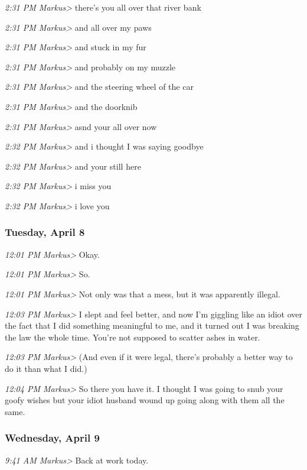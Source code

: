 {\emph{2:31 PM Markus\textgreater{}} there's you all over that river bank

\emph{2:31 PM Markus\textgreater{}} and all over my paws

\emph{2:31 PM Markus\textgreater{}} and stuck in my fur

\emph{2:31 PM Markus\textgreater{}} and probably on my muzzle

\emph{2:31 PM Markus\textgreater{}} and the steering wheel of the car

\emph{2:31 PM Markus\textgreater{}} and the doorknib

\emph{2:31 PM Markus\textgreater{}} asnd your all over now

\emph{2:32 PM Markus\textgreater{}} and i thought I was saying goodbye

\emph{2:32 PM Markus\textgreater{}} and your still here

\emph{2:32 PM Markus\textgreater{}} i miss you

\emph{2:32 PM Markus\textgreater{}} i love you

\subsubsection*{Tuesday, April 8}\label{tuesday-april-8}

\emph{12:01 PM Markus\textgreater{}} Okay.

\emph{12:01 PM Markus\textgreater{}} So.

\emph{12:01 PM Markus\textgreater{}} Not only was that a mess, but it
was apparently illegal.

\emph{12:03 PM Markus\textgreater{}} I slept and feel better, and now
I'm giggling like an idiot over the fact that I did something meaningful
to me, and it turned out I was breaking the law the whole time. You're
not supposed to scatter ashes in water.

\emph{12:03 PM Markus\textgreater{}} (And even if it were legal, there's
probably a better way to do it than what I did.)

\emph{12:04 PM Markus\textgreater{}} So there you have it. I thought I
was going to snub your goofy wishes but your idiot husband wound up
going along with them all the same.

\subsubsection*{Wednesday, April 9}\label{wednesday-april-9}

\emph{9:41 AM Markus\textgreater{}} Back at work today.

}
